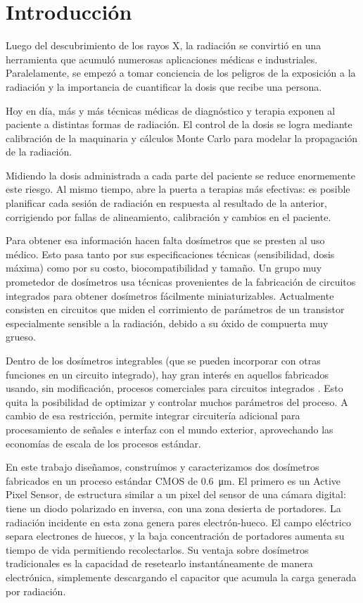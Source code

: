 \section{Introducción}
Luego del descubrimiento de los rayos X,
la radiación se convirtió en una herramienta
que acumuló numerosas aplicaciones médicas e industriales.
Paralelamente,
se empezó a tomar conciencia de 
los peligros de la exposición a la radiación
y la importancia de cuantificar la dosis que recibe una persona.

Hoy en día,
más y más técnicas médicas de diagnóstico y terapia
exponen al paciente a distintas formas de radiación.
El control de la dosis se logra mediante calibración de la maquinaria
y cálculos Monte Carlo para modelar la propagación de la radiación.

Midiendo la dosis administrada a cada parte del paciente
se reduce enormemente este riesgo.
Al mismo tiempo,
abre la puerta a terapias más efectivas:
es posible planificar cada sesión de radiación
en respuesta al resultado de la anterior,
corrigiendo por fallas de alineamiento, calibración y cambios en el
paciente\cite{wu_application_2006}.

Para obtener esa información hacen falta dosímetros 
que se presten al uso médico.
Esto pasa tanto por sus especificaciones técnicas
(sensibilidad, dosis máxima)
como por su costo,
biocompatibilidad y tamaño.
Un grupo muy prometedor de dosímetros usa técnicas 
provenientes de la fabricación de circuitos integrados 
para obtener dosímetros fácilmente
miniaturizables\cite{holmes-siedle_radfet:_1986}.
Actualmente consisten en circuitos que miden el corrimiento de parámetros de un transistor
especialmente sensible a la radiación, debido a su óxido de compuerta muy
grueso.

Dentro de los dosímetros integrables 
(que se pueden incorporar con otras funciones en un circuito integrado),
hay gran interés en aquellos fabricados usando, sin modificación,
procesos comerciales para circuitos integrados\cite{lipovetzky_field_2013}
\cite{wang_temperature_2005}
\cite{garcia-moreno_floating_2012}
\cite{dulinski_cmos_2004}.
Esto quita la posibilidad de optimizar y controlar 
muchos parámetros del proceso.
A cambio de esa restricción, 
permite integrar circuitería adicional
para procesamiento de señales e interfaz con el mundo exterior,
aprovechando las economías de escala de los procesos estándar.

En este trabajo diseñamos, construímos y caracterizamos
dos dosímetros fabricados en un proceso estándar CMOS de
\SI{0.6}{\micro\meter}.
El primero es un Active Pixel Sensor,
de estructura similar a un pixel del sensor de una cámara digital:
tiene un diodo polarizado en inversa, con una zona desierta de portadores.
La radiación incidente en esta zona genera pares electrón-hueco.
El campo eléctrico separa electrones de huecos,
y la baja concentración de portadores aumenta su tiempo de vida permitiendo
recolectarlos.
Su ventaja sobre dosímetros tradicionales es la capacidad de resetearlo
instantáneamente de manera electrónica,
simplemente descargando el capacitor que acumula la carga generada por
radiación.


